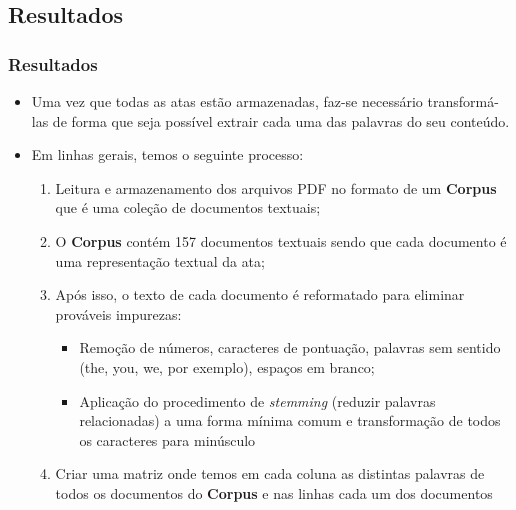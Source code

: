 \documentclass[aspectratio=169]{beamer}
\begin{document}

\subsection{Resultados}

\begin{frame}\frametitle{Resultados}
  \begin{itemize}
    \item Uma vez que todas as atas estão armazenadas, faz-se necessário transformá-las de forma que seja possível extrair cada uma das palavras do seu conteúdo. 
    \item Em linhas gerais, temos o seguinte processo:
      \begin{enumerate}
        \item Leitura e armazenamento dos arquivos PDF no formato de um \textbf{Corpus} que é uma coleção de documentos textuais;
        \item O \textbf{Corpus} contém 157 documentos textuais sendo que cada documento é uma representação textual da ata;
        \item Após isso, o texto de cada documento é reformatado para eliminar prováveis impurezas: 
        \begin{itemize}
          \item Remoção de números, caracteres de pontuação, palavras sem sentido (the, you, we, por exemplo), espaços em branco;
          \item Aplicação do procedimento de \emph{stemming} (reduzir palavras relacionadas) a uma forma mínima comum e transformação de todos os caracteres para minúsculo
        \end{itemize}
        \item Criar uma matriz onde temos em cada coluna as distintas palavras de todos os documentos do \textbf{Corpus} e nas linhas cada um dos documentos
      \end{enumerate}
  \end{itemize}
\end{frame}
\end{document}
